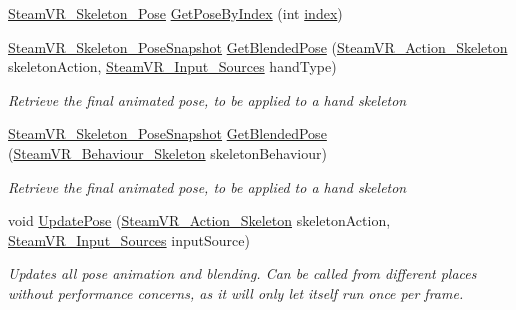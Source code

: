 \begin{DoxyCompactItemize}
\mbox{\hyperlink{class_valve_1_1_v_r_1_1_steam_v_r___skeleton___pose}{Steam\+V\+R\+\_\+\+Skeleton\+\_\+\+Pose}} \mbox{\hyperlink{class_valve_1_1_v_r_1_1_steam_v_r___skeleton___poser_a403f95ce0a6e6c69c48a27b40a719623}{Get\+Pose\+By\+Index}} (int \mbox{\hyperlink{namespace_valve_1_1_v_r_ac40c4bdf0a3dcd6e69cad2d85f287c67a6a992d5529f459a44fee58c733255e86}{index}})
\item 
\mbox{\hyperlink{class_valve_1_1_v_r_1_1_steam_v_r___skeleton___pose_snapshot}{Steam\+V\+R\+\_\+\+Skeleton\+\_\+\+Pose\+Snapshot}} \mbox{\hyperlink{class_valve_1_1_v_r_1_1_steam_v_r___skeleton___poser_a0decc52524d496af9eeff38c8d9f1dab}{Get\+Blended\+Pose}} (\mbox{\hyperlink{class_valve_1_1_v_r_1_1_steam_v_r___action___skeleton}{Steam\+V\+R\+\_\+\+Action\+\_\+\+Skeleton}} skeleton\+Action, \mbox{\hyperlink{namespace_valve_1_1_v_r_a82e5bf501cc3aa155444ee3f0662853f}{Steam\+V\+R\+\_\+\+Input\+\_\+\+Sources}} hand\+Type)
\begin{DoxyCompactList}\small\item\em Retrieve the final animated pose, to be applied to a hand skeleton \end{DoxyCompactList}\item 
\mbox{\hyperlink{class_valve_1_1_v_r_1_1_steam_v_r___skeleton___pose_snapshot}{Steam\+V\+R\+\_\+\+Skeleton\+\_\+\+Pose\+Snapshot}} \mbox{\hyperlink{class_valve_1_1_v_r_1_1_steam_v_r___skeleton___poser_a4033ee62539b088df573ff5785cb7bd7}{Get\+Blended\+Pose}} (\mbox{\hyperlink{class_valve_1_1_v_r_1_1_steam_v_r___behaviour___skeleton}{Steam\+V\+R\+\_\+\+Behaviour\+\_\+\+Skeleton}} skeleton\+Behaviour)
\begin{DoxyCompactList}\small\item\em Retrieve the final animated pose, to be applied to a hand skeleton \end{DoxyCompactList}\item 
void \mbox{\hyperlink{class_valve_1_1_v_r_1_1_steam_v_r___skeleton___poser_a02450c90d63ca61606ef052ecf07785b}{Update\+Pose}} (\mbox{\hyperlink{class_valve_1_1_v_r_1_1_steam_v_r___action___skeleton}{Steam\+V\+R\+\_\+\+Action\+\_\+\+Skeleton}} skeleton\+Action, \mbox{\hyperlink{namespace_valve_1_1_v_r_a82e5bf501cc3aa155444ee3f0662853f}{Steam\+V\+R\+\_\+\+Input\+\_\+\+Sources}} input\+Source)
\begin{DoxyCompactList}\small\item\em Updates all pose animation and blending. Can be called from different places without performance concerns, as it will only let itself run once per frame. \end{DoxyCompactList}\end{DoxyCompactItemize}
